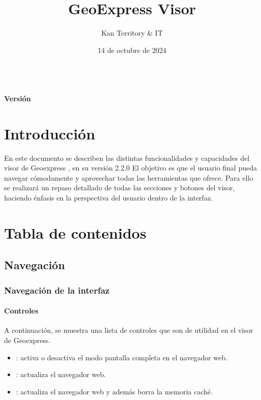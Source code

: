 \documentclass[a4paper,11pt,spanish]{sphinxmanual}
\author{}  %
\date{}    %
\title{GeoExpress Visor}
\date{14 de octubre de 2024}
\author{Kan Territory \& IT}
\renewcommand{\sphinxmaketitle}{%
  \begin{titlepage}
    \vspace*{6cm} %
    \begin{center}
      {\Huge \sffamily \bfseries \color[RGB]{240,56,97} \sphinxproject} \\[1em] %
      {\Large \sffamily \bfseries \color[RGB]{240,56,97} Versión \sphinxrelease} %
    \end{center}
  \end{titlepage}
}
\begin{document}
\pagestyle{empty}
\sphinxmaketitle
\pagestyle{plain}
\sphinxtableofcontents
\pagestyle{normal}
\label{\detokenize{index::doc}}



\chapter{Introducción}
\label{\detokenize{index:introduccion}}
\sphinxAtStartPar
En este documento se describen las distintas funcionalidades y capacidades del visor de Geoexpress , en su versión 2.2.0
El objetivo es que el usuario final pueda navegar cómodamente y aprovechar todas las herramientas que ofrece. Para ello se realizará un repaso detallado de todas las secciones y botones del visor, haciendo énfasis en la perspectiva del usuario dentro de la interfaz.

\noindent{}


\chapter{Tabla de contenidos}
\label{\detokenize{index:tabla-de-contenidos}}
\sphinxstepscope


\section{Navegación}
\label{\detokenize{navigation/index:navegacion}}\label{\detokenize{navigation/index::doc}}
\sphinxstepscope


\subsection{Navegación de la interfaz}
\label{\detokenize{navigation/interfaz:navegacion-de-la-interfaz}}\label{\detokenize{navigation/interfaz::doc}}

\subsubsection{Controles}
\label{\detokenize{navigation/interfaz:controles}}
\sphinxAtStartPar
A continuación, se muestra una lista de controles que son de utilidad en el visor de Geoexpress.
\begin{itemize}
\item {} 
\sphinxAtStartPar
{}: activa o desactiva el modo pantalla completa en el navegador web.

\item {} 
\sphinxAtStartPar
{}: actualiza el navegador web.

\item {} 
\sphinxAtStartPar
{}: actualiza el navegador web y además borra la memoria caché.

\end{itemize}
\end{document}
